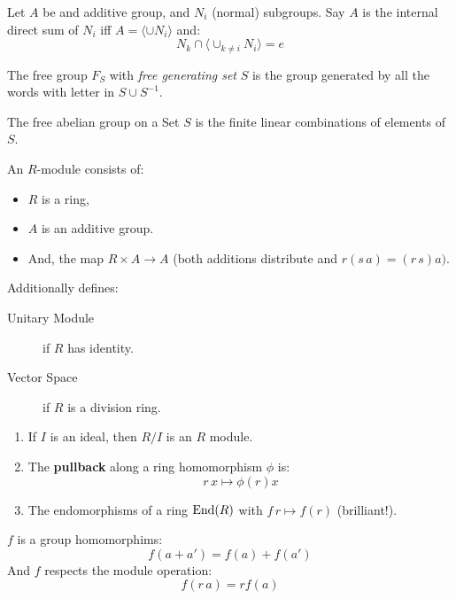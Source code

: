 \begin{ddef}
    Let $A$ be and additive group, and $N_i$ (normal) subgroups. Say $A$ is the internal direct sum of $N_i$ iff $A=\langle \cup N_i\rangle$ and:
    $$N_k \cap\langle \cup_{k\neq i}N_i\rangle=e $$
\end{ddef}

\begin{ddef}
    The free group $F_S$ with \emph{free generating set} $S$ is the group generated by all the words with letter in $S\cup S^{-1}$.
\end{ddef}

\begin{ddef}
    The free abelian group on a Set $S$ is the finite linear combinations of elements of $S$.
\end{ddef}



\begin{ddef}[Modules]
An $R$-module consists of:
\begin{itemize}
\item $R$ is a ring, 
\item $A$ is an additive group.
\item And, the map $R\times A \to A$ (both additions distribute and $r(s\,a)=(r\,s)a)$.
\end{itemize}
Additionally defines:
\begin{description}
    \item[Unitary Module] if $R$ has identity.
    \item[Vector Space] if $R$ is a division ring.
\end{description}
\end{ddef}

\begin{examples}
    \begin{enumerate}
        \item If $I$ is an ideal, then $R/I$ is an $R$ module.
        \item The \textbf{pullback} along a ring homomorphism $\phi$ is:
            $$r\,x \mapsto \phi(r)x$$
        \item The endomorphisms of a ring $\operatorname{End}(R)$ with $f\,r \mapsto f(r)$ (brilliant!). 
    \end{enumerate}
\end{examples}

\begin{ddef}
    $f$ is a group homomorphims:
    $$f(a+a') = f(a)+f(a')$$
    And $f$ respects the module operation:
    $$f(r\,a) = rf(a)$$
\end{ddef}

